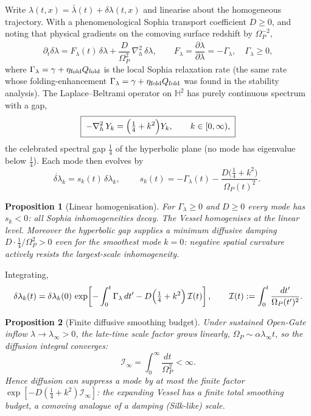 \documentclass[11pt,a4paper]{article}
\newcommand{\Op}{\Omega_P}
\newcommand{\Hh}{\mathbb{H}^2}
\newcommand{\laph}{\nabla_h^2}
\newcommand{\Qf}{Q_{\rm fold}}
\newcommand{\etaf}{\eta_{\rm fold}}
\newcommand{\Glam}{\Gamma_\lambda}
\newcommand{\dlam}{\delta\lambda}
\theoremstyle{plain}
\newtheorem{proposition}{Proposition}[section]
\theoremstyle{definition}
\theoremstyle{remark}
\begin{document}
Write $\lambda(t,x)=\bar\lambda(t)+\dlam(t,x)$ and linearise about the homogeneous trajectory. With a
phenomenological Sophia transport coefficient $D\ge0$, and noting that physical gradients on the
comoving surface redshift by $\Op^{-2}$,
\begin{equation}
\partial_t\dlam=F_\lambda(t)\,\dlam+\frac{D}{\Op^2}\,\laph\,\dlam,
\qquad
F_\lambda=\frac{\partial\dot\lambda}{\partial\lambda}=-\Glam,\quad \Glam\ge0,
\end{equation}
where $\Glam=\gamma+\eta_{\rm fold}\Qf$ is the local Sophia relaxation rate (the same rate whose
folding-enhancement $\Glam=\gamma+\etaf\Qf$ was found in the stability analysis). The Laplace--Beltrami
operator on $\Hh$ has purely continuous spectrum with a gap,
\begin{equation}
\boxed{\;-\laph\,Y_k=\Bigl(\tfrac14+k^2\Bigr)Y_k,\qquad k\in[0,\infty),\;}
\end{equation}
the celebrated spectral gap $\tfrac14$ of the hyperbolic plane (no mode has eigenvalue below $\tfrac14$).
Each mode then evolves by
\begin{equation}
\dot{\dlam}_k=s_k(t)\,\dlam_k,
\qquad
\boxed{\;s_k(t)=-\Glam(t)-\frac{D\bigl(\tfrac14+k^2\bigr)}{\Op(t)^2}.\;}
\end{equation}

\begin{proposition}[Linear homogenisation]
For $\Glam\ge0$ and $D\ge0$ every mode has $s_k<0$: all Sophia inhomogeneities decay. The Vessel
homogenises at the linear level. Moreover the hyperbolic gap supplies a minimum diffusive damping
$D\cdot\tfrac14/\Op^2>0$ even for the smoothest mode $k=0$: negative spatial curvature actively resists
the largest-scale inhomogeneity.
\end{proposition}

Integrating,
\begin{equation}
\dlam_k(t)=\dlam_k(0)\,\exp\!\left[-\int_0^t\Glam\,dt'-D\Bigl(\tfrac14+k^2\Bigr)\,\mathcal I(t)\right],
\qquad
\mathcal I(t):=\int_0^t\frac{dt'}{\Op(t')^2}.
\end{equation}

\begin{proposition}[Finite diffusive smoothing budget]
Under sustained Open-Gate inflow $\lambda\to\lambda_\infty>0$, the late-time scale factor grows linearly,
$\Op\sim\alpha\lambda_\infty t$, so the diffusion integral converges:
\begin{equation}
\boxed{\;\mathcal I_\infty=\int_0^\infty\frac{dt}{\Op^2}<\infty.\;}
\end{equation}
Hence diffusion can suppress a mode by at most the finite factor
$\exp[-D(\tfrac14+k^2)\mathcal I_\infty]$: the expanding Vessel has a finite total smoothing budget, a
comoving analogue of a damping (Silk-like) scale.
\end{proposition}
\end{document}
